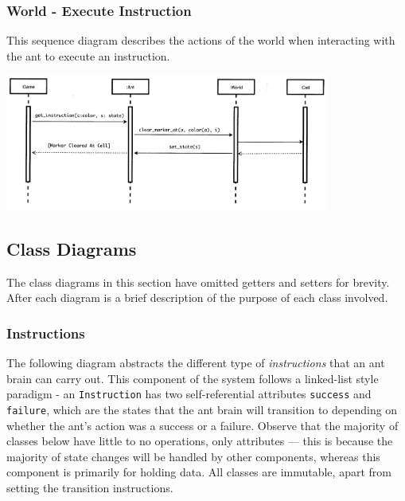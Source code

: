 \documentclass[11pt]{article}
\begin{document}
\subsubsection{World - Execute Instruction}

This sequence diagram describes the actions of the world when interacting with the ant to execute an instruction.

\begin{center}
\includegraphics[width=0.8\textwidth]{low-level-diagrams/sequence/ant-unmark.png}
\end{center}

\subsection{Class Diagrams}

The class diagrams in this section have omitted getters and setters for brevity. After each diagram is a brief description of the purpose of each class involved.

\subsubsection{Instructions}

The following diagram abstracts the different type of \textit{instructions} that an ant brain can carry out. This component of the system follows a linked-list style paradigm - an \texttt{Instruction} has two self-referential attributes \texttt{success} and \texttt{failure}, which are the states that the ant brain will transition to depending on whether the ant's action was a success or a failure. Observe that the majority of classes below have little to no operations, only attributes --- this is because the majority of state changes will be handled by other components, whereas this component is primarily for holding data. All classes are immutable, apart from setting the transition instructions.
 
\end{document}
